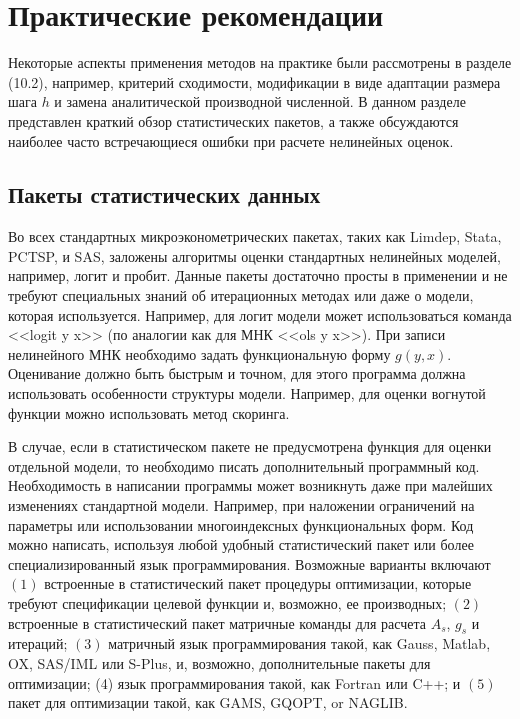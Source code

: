\section{Практические рекомендации}

Некоторые аспекты применения методов на практике были рассмотрены в разделе (10.2), например, критерий сходимости, модификации в виде адаптации размера шага $h$ и замена аналитической производной численной. В данном разделе представлен краткий обзор статистических пакетов, а также обсуждаются наиболее часто встречающиеся ошибки при расчете нелинейных оценок. 

\subsection{Пакеты статистических данных}

Во всех стандартных микроэконометрических пакетах, таких как Limdep, Stata, PCTSP, и SAS, заложены алгоритмы оценки стандартных нелинейных моделей, например, логит и пробит. Данные пакеты достаточно просты в применении и не требуют специальных знаний об итерационных методах или даже о модели, которая используется. Например, для логит модели может использоваться команда <<logit y x>> (по аналогии как для МНК <<ols y x>>). При записи нелинейного МНК необходимо задать функциональную форму $g(y,x)$. Оценивание должно быть быстрым и точном, для этого программа должна использовать особенности структуры модели. Например, для оценки вогнутой функции можно использовать метод скоринга.

В случае, если в статистическом пакете не предусмотрена функция для оценки отдельной модели, то необходимо писать дополнительный программный код. Необходимость в написании программы может возникнуть даже при малейших изменениях стандартной модели. Например, при наложении ограничений на параметры или использовании многоиндексных функциональных форм. Код можно написать, используя любой удобный статистический пакет или более специализированный язык программирования. Возможные варианты включают $(1)$ встроенные в статистический пакет процедуры оптимизации, которые требуют спецификации целевой функции и, возможно, ее производных; $(2)$ встроенные в статистический пакет матричные команды для расчета $A_s$, $g_s$ и итераций; $(3)$ матричный язык программирования такой, как Gauss, Matlab, OX, SAS/IML или S-Plus, и, возможно, дополнительные пакеты для оптимизации; (4) язык программирования такой, как  Fortran или C++; и $(5)$ пакет для оптимизации такой, как GAMS, GQOPT, or NAGLIB.

